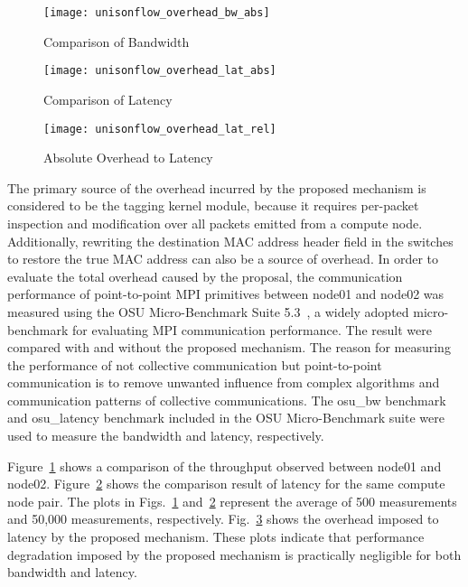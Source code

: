 \begin{figure}
    \centering
    \texttt{[image: unisonflow\_overhead\_bw\_abs]}
    \caption{Comparison of Bandwidth}%
    \label{fig:overhead-bandwidth}
\end{figure}

\begin{figure}
    \centering
    \texttt{[image: unisonflow\_overhead\_lat\_abs]}
    \caption{Comparison of Latency}%
    \label{fig:overhead-latency}
\end{figure}

\begin{figure}
    \centering
    \texttt{[image: unisonflow\_overhead\_lat\_rel]}
    \caption{Absolute Overhead to Latency}
    \label{fig:overhead-latency-2}
\end{figure}

The primary source of the overhead incurred by the proposed mechanism is
considered to be the tagging kernel module, because it requires
per-packet inspection and modification over all packets emitted from a
compute node. Additionally, rewriting the destination MAC address
header field in the switches to restore the true MAC address can also be
a source of overhead. In order to evaluate the total overhead caused by
the proposal, the communication performance of point-to-point MPI primitives
between node01 and node02 was measured using the OSU Micro-Benchmark Suite
5.3~\autocite{omb}, a widely adopted micro-benchmark for evaluating MPI
communication performance. The result were compared  with and without the
proposed mechanism. The reason for measuring the performance of not collective
communication but point-to-point communication is to remove unwanted influence
from complex algorithms and communication patterns of collective
communications. The osu\_bw benchmark and osu\_latency benchmark included in
the OSU Micro-Benchmark suite were used to measure the bandwidth and latency,
respectively.

Figure~\ref{fig:overhead-bandwidth} shows a comparison of the throughput
observed between node01 and node02. Figure~\ref{fig:overhead-latency} shows
the comparison result of latency for the same compute node pair. The plots in
Figs.~\ref{fig:overhead-bandwidth} and~\ref{fig:overhead-latency} represent
the average of 500 measurements and 50,000 measurements, respectively.
Fig.~\ref{fig:overhead-latency-2} shows the overhead imposed to latency by the
proposed mechanism. These plots indicate that performance degradation imposed
by the proposed mechanism is practically negligible for both bandwidth and
latency.

